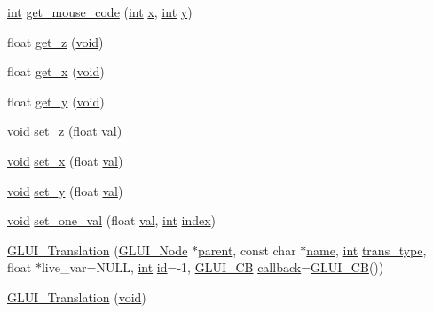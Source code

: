 \begin{DoxyCompactItemize}
\hyperlink{wglext_8h_a500a82aecba06f4550f6849b8099ca21}{int} \hyperlink{class_g_l_u_i___translation_a6f1d169e372f206c7d9299d75b0508bf}{get\+\_\+mouse\+\_\+code} (\hyperlink{wglext_8h_a500a82aecba06f4550f6849b8099ca21}{int} \hyperlink{glext_8h_ad77deca22f617d3f0e0eb786445689fc}{x}, \hyperlink{wglext_8h_a500a82aecba06f4550f6849b8099ca21}{int} \hyperlink{glext_8h_a9298c7ad619074f5285b32c6b72bfdea}{y})
\item 
float \hyperlink{class_g_l_u_i___translation_a0c2156978610e8012928e3bb906d8352}{get\+\_\+z} (\hyperlink{wglext_8h_a9e6b7f1933461ef318bb000d6bd13b83}{void})
\item 
float \hyperlink{class_g_l_u_i___translation_ac3c6c8da177d6cb841c65a8f1ae33ebc}{get\+\_\+x} (\hyperlink{wglext_8h_a9e6b7f1933461ef318bb000d6bd13b83}{void})
\item 
float \hyperlink{class_g_l_u_i___translation_aa2863477d762d4a29a7b19ef3454a3bb}{get\+\_\+y} (\hyperlink{wglext_8h_a9e6b7f1933461ef318bb000d6bd13b83}{void})
\item 
\hyperlink{wglext_8h_a9e6b7f1933461ef318bb000d6bd13b83}{void} \hyperlink{class_g_l_u_i___translation_aa82c90797ca5cd0f6a79233693398e15}{set\+\_\+z} (float \hyperlink{glext_8h_a26942fd2ed566ef553eae82d2c109c8f}{val})
\item 
\hyperlink{wglext_8h_a9e6b7f1933461ef318bb000d6bd13b83}{void} \hyperlink{class_g_l_u_i___translation_acf59403020d9552c9be4afe774ad59a4}{set\+\_\+x} (float \hyperlink{glext_8h_a26942fd2ed566ef553eae82d2c109c8f}{val})
\item 
\hyperlink{wglext_8h_a9e6b7f1933461ef318bb000d6bd13b83}{void} \hyperlink{class_g_l_u_i___translation_ae6eed14a15be75c89bdd91b1cd9c3ead}{set\+\_\+y} (float \hyperlink{glext_8h_a26942fd2ed566ef553eae82d2c109c8f}{val})
\item 
\hyperlink{wglext_8h_a9e6b7f1933461ef318bb000d6bd13b83}{void} \hyperlink{class_g_l_u_i___translation_a8da9c19319e63bccbbe1b3c4b7cc1982}{set\+\_\+one\+\_\+val} (float \hyperlink{glext_8h_a26942fd2ed566ef553eae82d2c109c8f}{val}, \hyperlink{wglext_8h_a500a82aecba06f4550f6849b8099ca21}{int} \hyperlink{glext_8h_a57f14e05b1900f16a2da82ade47d0c6d}{index})
\item 
\hyperlink{class_g_l_u_i___translation_a078dd021e5c4870e901d459d6dd0ec9a}{G\+L\+U\+I\+\_\+\+Translation} (\hyperlink{class_g_l_u_i___node}{G\+L\+U\+I\+\_\+\+Node} $\ast$\hyperlink{class_g_l_u_i___node_a8ed65d447784f6f88bd3e2e2bcac6cdb}{parent}, const char $\ast$\hyperlink{glext_8h_ad977737dfc9a274a62741b9500c49a32}{name}, \hyperlink{wglext_8h_a500a82aecba06f4550f6849b8099ca21}{int} \hyperlink{class_g_l_u_i___translation_a77dc15982b9c636e04d8bc815507e119}{trans\+\_\+type}, float $\ast$live\+\_\+var=N\+U\+L\+L, \hyperlink{wglext_8h_a500a82aecba06f4550f6849b8099ca21}{int} \hyperlink{glext_8h_a58c2a664503e14ffb8f21012aabff3e9}{id}=-\/1, \hyperlink{class_g_l_u_i___c_b}{G\+L\+U\+I\+\_\+\+C\+B} \hyperlink{class_g_l_u_i___control_a96060fe0cc6d537e736dd6eef78e24ab}{callback}=\hyperlink{class_g_l_u_i___c_b}{G\+L\+U\+I\+\_\+\+C\+B}())
\item 
\hyperlink{class_g_l_u_i___translation_a04f844c9cbc387d3409d44e9ba6fdb49}{G\+L\+U\+I\+\_\+\+Translation} (\hyperlink{wglext_8h_a9e6b7f1933461ef318bb000d6bd13b83}{void})
\end{DoxyCompactItemize}
